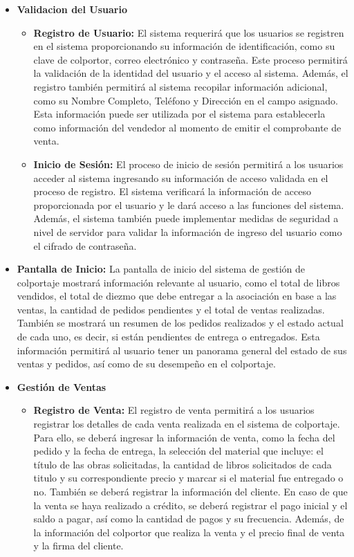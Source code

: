 \documentclass[runningheads]{llncs}
\begin{document}
\begin{itemize}
    \item \textbf{Validacion del Usuario}
    \begin{itemize}
        \item \textbf{Registro de Usuario: }El sistema requerirá que los usuarios se registren en el sistema proporcionando su información de identificación, como su clave de colportor, correo electrónico y contraseña. Este proceso permitirá la validación de la identidad del usuario y el acceso al sistema. Además, el registro también permitirá al sistema recopilar información adicional, como su Nombre Completo, Teléfono y Dirección en el campo asignado. Esta información puede ser utilizada por el sistema para establecerla como información del vendedor al momento de emitir el comprobante de venta.
        \item \textbf{Inicio de Sesión: }El proceso de inicio de sesión permitirá a los usuarios acceder al sistema ingresando su información de acceso validada en el proceso de registro. El sistema verificará la información de acceso proporcionada por el usuario y le dará acceso a las funciones del sistema. Además, el sistema también puede implementar medidas de seguridad a nivel de servidor para validar la información de ingreso del usuario como el cifrado de contraseña.
    \end{itemize}    
    \item \textbf{Pantalla de Inicio: }
    La pantalla de inicio del sistema de gestión de colportaje mostrará información relevante al usuario, como el total de libros vendidos, el total de diezmo que debe entregar a la asociación en base a las ventas, la cantidad de pedidos pendientes y el total de ventas realizadas. También se mostrará un resumen de los pedidos realizados y el estado actual de cada uno, es decir, si están pendientes de entrega o entregados. Esta información permitirá al usuario tener un panorama general del estado de sus ventas y pedidos, así como de su desempeño en el colportaje.
    \item \textbf{Gestión de Ventas}
    \begin{itemize}
        \item \textbf{Registro de Venta: }El registro de venta permitirá a los usuarios registrar los detalles de cada venta realizada en el sistema de colportaje. Para ello, se deberá ingresar la información de venta, como la fecha del pedido y la fecha de entrega, la selección del material que incluye: el título de las obras solicitadas, la cantidad de libros solicitados de cada titulo y su correspondiente precio y marcar si el material fue entregado o no. También se deberá registrar la información del cliente. En caso de que la venta se haya realizado a crédito, se deberá registrar el pago inicial y el saldo a pagar, así como la cantidad de pagos y su frecuencia. Además, de la información del colportor que realiza la venta y el precio final de venta y la firma del cliente.

\end{itemize}
\end{itemize}
\end{document}

